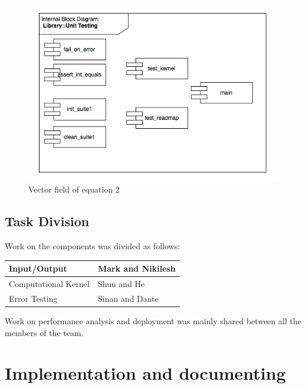 \documentclass[12pt,a4paper]{article}
\begin{document}
\begin{figure}[hb]
    \centering
    \includegraphics[scale=0.6]{images/bd4.png}
    \caption{Vector field of equation 2}
\end{figure}

\clearpage


\subsection{Task Division}

Work on the components was divided as follows:

\begin{tabular}{ | l || l | }
    \hline
    Input/Output  & Mark and Nikilesh \\
    \hline
    Computational Kernel & Shun and He \\
    \hline
    Error Testing & Sinan and Dante \\
    \hline
\end{tabular}

Work on performance analysis and deployment was mainly shared between all the members of the team.

%
%
%

\section{Implementation and documenting}
\end{document}
